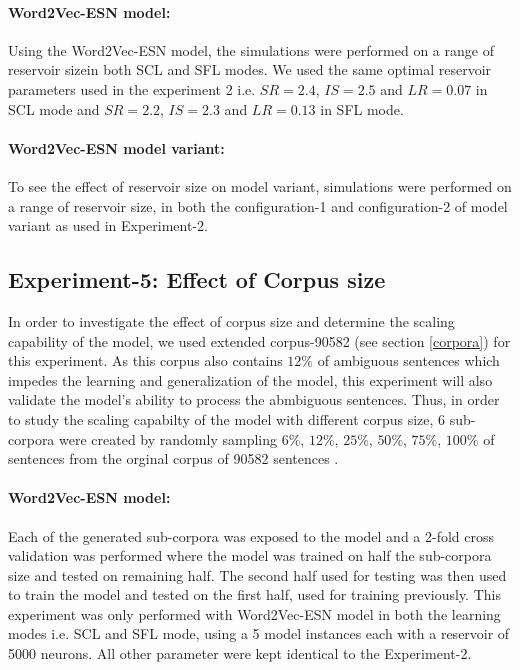 \paragraph{Word2Vec-ESN model:} Using the Word2Vec-ESN model, the simulations were performed on a range of reservoir size\footnotemark[1] in both SCL and SFL modes. We used the same optimal reservoir parameters used in the experiment 2 i.e. $SR = 2.4$, $IS = 2.5$ and $LR = 0.07$ in SCL mode and $SR = 2.2$, $IS = 2.3$ and $LR = 0.13$ in SFL mode. 

\paragraph{Word2Vec-ESN model variant: } To see the effect of reservoir size on model variant, simulations were performed on a range of reservoir size\footnotemark[2], in both the configuration-1 and configuration-2 of model variant as used in Experiment-2. 

\subsection{Experiment-5: Effect of Corpus size} \label{exp-5}

In order to investigate the effect of corpus size and determine the scaling capability of the model, we used extended corpus-90582 (see section \ref{corpora}) for this experiment. As this corpus also contains $12\%$ of ambiguous sentences which impedes the learning and generalization of the model, this experiment will also validate the model's ability to process the abmbiguous sentences. Thus, in order to study the scaling capabilty of the model with different corpus size, 6 sub-corpora were created by randomly sampling $6\%$, $12\%$, $25\%$, $50\%$, $75\%$, $100\%$ of sentences from the orginal corpus of 90582 sentences \cite{xavier:2013:RT}.

\paragraph{Word2Vec-ESN model:} Each of the generated sub-corpora was exposed to the model and a 2-fold cross validation was performed where the model was trained on half the sub-corpora size and tested on remaining half. The second half used for testing was then used to train the model and tested on the first half, used for training previously. This experiment was only performed with Word2Vec-ESN model in both the learning modes i.e. SCL and SFL mode, using a 5 model instances each with a reservoir of 5000 neurons. All other parameter were kept identical to the Experiment-2. 

